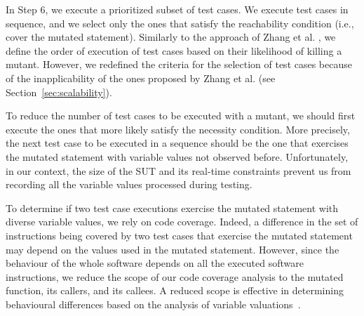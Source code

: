 In Step 6, we execute a prioritized subset of test cases. 
We execute test cases in sequence, and we select only the ones that satisfy 
the reachability condition (i.e., cover the mutated statement).
Similarly to the approach of Zhang et al. \cite{zhang2013faster}, we define the order of execution of test cases based on their likelihood of killing a mutant. However, we redefined the criteria for the selection of test cases because of the inapplicability of the ones proposed by Zhang et al. (see Section~\ref{sec:scalability}).



To reduce the number of test cases to be executed with a mutant, 
we should first execute the ones that more likely satisfy the necessity condition. 
More precisely, the next test case to be executed in a sequence should be the one that exercises the mutated statement with variable values not observed before. 
Unfortunately, in our context, the size of the SUT and its real-time constraints prevent us from recording all the variable values processed during testing. 

To determine if two test case executions exercise the mutated statement with diverse variable values, we rely on code coverage.
Indeed, a difference in the set of instructions being covered by two test cases that exercise the mutated statement may depend on the values used in the mutated statement. 
However, since the behaviour of the whole software depends on all the executed software instructions, we reduce the scope of our code coverage analysis 
to the mutated function, its callers, and its callees.
A reduced scope is effective in determining behavioural differences based on the analysis of variable valuations~\cite{Pastore:VART:2014}.

